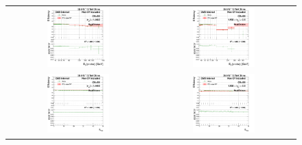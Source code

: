 \begin{figure}[bh]
  \begin{center}
    \begin{tabular}{cc}
      \includegraphics[width=0.45\textwidth]{figures/Zprime/2016/ScaleFactor/SameSign/N_1_eff/g_compare_cut_Et_Barrel_ea_ta_inc_AS_N_1_EcalDriven_PUW.png} &
      \includegraphics[width=0.45\textwidth]{figures/Zprime/2016/ScaleFactor/SameSign/N_1_eff/g_compare_cut_Et_Endcap_ea_ta_inc_AS_N_1_EcalDriven_PUW.png} \\
      \includegraphics[width=0.45\textwidth]{figures/Zprime/2016/ScaleFactor/SameSign/N_1_eff/g_compare_cut_nVtx_Barrel_ea_ta_inc_AS_N_1_EcalDriven_PUW.png} &
      \includegraphics[width=0.45\textwidth]{figures/Zprime/2016/ScaleFactor/SameSign/N_1_eff/g_compare_cut_nVtx_Endcap_ea_ta_inc_AS_N_1_EcalDriven_PUW.png} \\

\end{tabular}
\end{center}
\end{figure}
